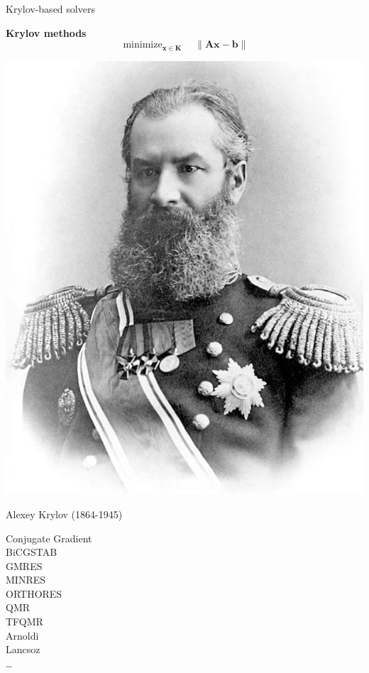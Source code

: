 \documentclass[aspectratio=169]{beamer}
\DeclareMathOperator*{\minimize}{minimize}
\begin{document}
\begin{frame}[t, c]{Krylov-based solvers}{}
  \begin{minipage}{.68\textwidth}
    \centering
    \textbf{Krylov methods}
    \Large
    \[
    \minimize_{\bm{x} \in \bm{K}} \quad \| \bm{Ax} - \bm{b} \|
    \]
  \end{minipage}%
  \hfill
  \begin{minipage}{.28\textwidth}
    \begin{overprint}
      \centering
      \vfill
      \includegraphics[width=\textwidth]{alexey_krylov}

      \small
      Alexey Krylov (1864-1945)
      \vfill

      \vfill
      Conjugate Gradient \\
      BiCGSTAB \\
      GMRES \\
      MINRES \\
      ORTHORES \\
      QMR \\
      TFQMR \\
      Arnoldi \\
      Lancsoz \\
      \ldots
      \vfill
    \end{overprint}
  \end{minipage}
\end{frame}
\end{document}
